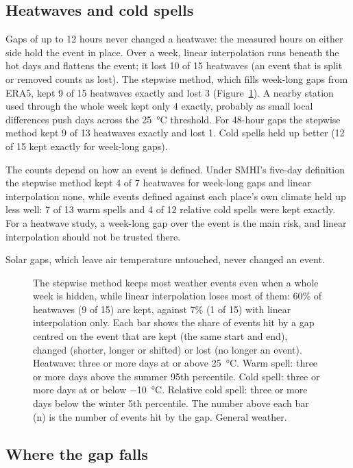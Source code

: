 \subsection{Heatwaves and cold spells}\label{sec:5.4}

Gaps of up to 12 hours never changed a heatwave: the measured hours on either side hold the event in place. Over a week, linear interpolation runs beneath the hot days and flattens the event; it lost 10 of 15 heatwaves (an event that is split or removed counts as lost). The stepwise method, which fills week-long gaps from ERA5, kept 9 of 15 heatwaves exactly and lost 3 (Figure~\ref{fig:9}). A nearby station used through the whole week kept only 4 exactly, probably as small local differences push days across the 25~°C threshold. For 48-hour gaps the stepwise method kept 9 of 13 heatwaves exactly and lost 1. Cold spells held up better (12 of 15 kept exactly for week-long gaps).

The counts depend on how an event is defined. Under SMHI's five-day definition the stepwise method kept 4 of 7 heatwaves for week-long gaps and linear interpolation none, while events defined against each place's own climate held up less well: 7 of 13 warm spells and 4 of 12 relative cold spells were kept exactly. For a heatwave study, a week-long gap over the event is the main risk, and linear interpolation should not be trusted there.

Solar gaps, which leave air temperature untouched, never changed an event.

\begin{figure}[tbp]
\centering
{}
\caption{The stepwise method keeps most weather events even when a whole week is hidden, while linear interpolation loses most of them: 60\% of heatwaves (9 of 15) are kept, against 7\% (1 of 15) with linear interpolation only. Each bar shows the share of events hit by a gap centred on the event that are kept (the same start and end), changed (shorter, longer or shifted) or lost (no longer an event). Heatwave: three or more days at or above 25~°C. Warm spell: three or more days above the summer 95th percentile. Cold spell: three or more days at or below −10~°C. Relative cold spell: three or more days below the winter 5th percentile. The number above each bar (n) is the number of events hit by the gap. General weather.}
\label{fig:9}
\end{figure}

\subsection{Where the gap falls}\label{sec:5.5}


